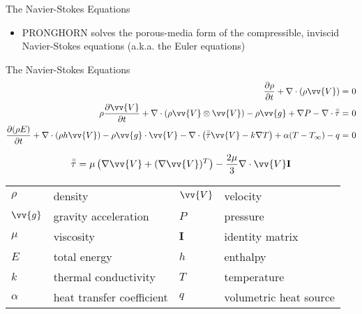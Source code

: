 \documentclass{beamer}
\begin{document}

\begin{frame}{The Navier-Stokes Equations}

\begin{itemize}
\item PRONGHORN solves the porous-media form of the compressible, inviscid Navier-Stokes equations (a.k.a. the Euler equations)
\end{itemize}

\end{frame}


\begin{frame}{The Navier-Stokes Equations}
\small
\begin{equation}
\begin{aligned}
\frac{\partial\rho}{\partial t} + \nabla\cdot(\rho\vv{V})=&\ 0\\
\rho\frac{\partial\vv{V}}{\partial t}+\nabla\cdot(\rho\vv{V}\otimes\vv{V})-\rho \vv{g}+\nabla P-\nabla\cdot\bar{\bar{\tau}}=&\ 0\\
\frac{\partial (\rho E)}{\partial t}+\nabla\cdot(\rho h\vv{V})-\rho \vv{g}\cdot\vv{V}-\nabla\cdot\left(\bar{\bar{\tau}}\vv{V}-k\nabla T\right)+\alpha(T-T_\infty)-q=&\ 0\\
\end{aligned}
\end{equation}

\begin{equation}
\bar{\bar{\tau}}= \mu\left(\nabla \vv{V}+(\nabla \vv{V})^T\right)-\frac{2\mu}{3}\nabla\cdot\vv{V}\textbf{I}
\end{equation}

\normalsize
\begin{tabular}{l l l l}
\(\rho\) & density & \(\vv{V}\) & velocity\\
\(\vv{g}\) & gravity acceleration & \(P\) & pressure\\
\(\mu\) & viscosity & \(\textbf{I}\) & identity matrix\\
\(E\) & total energy & \(h\) & enthalpy\\
\(k\) & thermal conductivity & \(T\) & temperature\\
\(\alpha\) & heat transfer coefficient & \(q\) & volumetric heat source\\
\end{tabular}

\end{frame}

\end{document}
